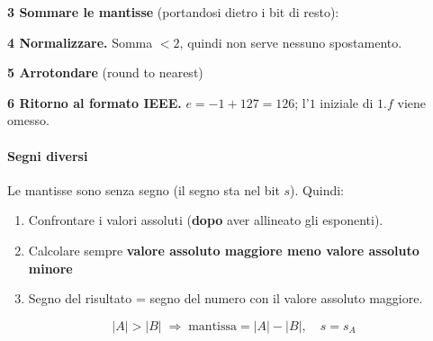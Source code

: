 \noindent\textbf{3 Sommare le mantisse} (portandosi dietro i bit di resto):
\smallskip

\medskip

\noindent\textbf{4 Normalizzare.} Somma $< 2$, quindi non serve nessuno spostamento.
\medskip

\noindent\textbf{5 Arrotondare} (round to nearest)
\smallskip

\medskip

\noindent\textbf{6 Ritorno al formato IEEE.} $e = -1 + 127 = 126$; l'$1$ iniziale di $1.f$ viene omesso.
\smallskip

\medskip

\paragraph{\color{blue}Segni diversi}
Le mantisse sono senza segno (il segno sta nel bit $s$). Quindi:
\begin{enumerate}
  \item Confrontare i valori assoluti (\textbf{dopo} aver allineato gli esponenti).
  \item Calcolare sempre \textbf{valore assoluto maggiore meno valore assoluto minore}
  \item Segno del risultato = segno del numero con il valore assoluto maggiore.
\end{enumerate}
\[
  |A| > |B| \;\Rightarrow\; \text{mantissa} = |A| - |B|, \quad s = s_A
\]

